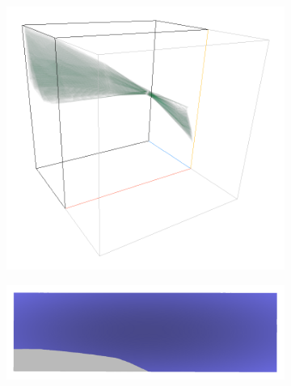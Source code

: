 \documentclass[a4paper,fontsize=12pt,toc=bib,halfparskip,ngerman]{scrartcl}
\begin{document}
\begin{figure}
\begin{subfigure}{0.4\textwidth}
		\includegraphics[width=\textwidth]{pictures/results/Beam/Beam_InvariantSpace2.png}
		\subcaption{}
		\label{BeamInvariant2}
	\end{subfigure}
	\hspace*{\fill}
	\begin{subfigure}{0.4\textwidth}
		\centering
		\includegraphics[width=\textwidth]{pictures/results/Beam/Beam_Object2.png}
		\subcaption{}
		\label{BeamObject2}
	\end{subfigure}
	\medskip
	\begin{subfigure}{0.4\textwidth}
		\centering

\end{subfigure}
\end{figure}
\end{document}

